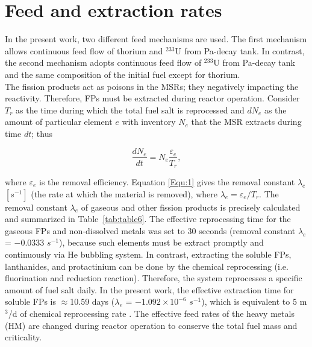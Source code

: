 \section{Feed and extraction rates}
In the present work, two different feed mechanisms are used. The first mechanism allows continuous feed flow of thorium and $^{233}$U from Pa-decay tank. In contrast, the second mechanism adopts continuous feed flow of $^{233}$U from Pa-decay tank and the same composition of the initial fuel except for thorium. \\
The fission products act as poisons in the MSRs; they negatively impacting the reactivity. Therefore, \gls{FPs} must be extracted during reactor operation. Consider $T_{r}$ as the time during which the total fuel salt is reprocessed and $dN_{e}$ as the amount of particular element $e$ with inventory $N_{e}$ that the \gls{MSR} extracts during time $dt$; thus \cite{nuttin2005potential}

\begin{equation}
\label{Equ:1}
\dfrac{dN_{e}}{dt} = N_{e}\dfrac{\varepsilon_{e}}{T_{r}},	
\end{equation}

where $\varepsilon_{e}$ is the removal efficiency. Equation \ref{Equ:1} gives the removal constant $\lambda_{e}$ $[s^{-1}]$ (the rate at which the material is removed), where $\lambda_{e}=\varepsilon_{e}/T_{r}$. The removal constant $\lambda_{e}$ of gaseous and other fission products is precisely calculated and summarized in Table~\ref{tab:table6}.
The effective reprocessing time for the gaseous \gls{FPs} and non-dissolved metals was set to 30 seconds (removal constant $\lambda_{e}$ = $-0.0333$ $s^{-1}$), because such elements must be extract promptly and continuously via He bubbling system. In contrast, extracting the soluble \gls{FPs}, lanthanides, and protactinium can be done by the chemical reprocessing (i.e. fluorination and reduction reaction). Therefore, the system reprocesses a specific amount of fuel salt daily. In the present work, the effective extraction time for soluble \gls{FPs} is $\approx$10.59 days ($\lambda_{e}$ = $-1.092\times10^{-6}$ $s^{-1}$), which is equivalent to 5 m$^3$/d of chemical reprocessing rate \cite{nuttin2005potential,li_optimization_2018}. The effective feed rates of the heavy metals (HM) are changed during reactor operation to conserve the total fuel mass and criticality.


